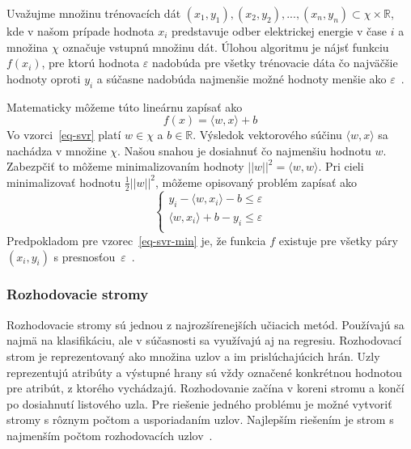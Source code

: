 \documentclass[a4paper,slovak,12pt,appendix]{article}
\begin{document}
Uvažujme množinu trénovacích dát
${(x_1, y_1), (x_2, y_2), ..., (x_n, y_n)} \subset \chi \times \mathbb{R}$, kde
v našom prípade hodnota $x_i$ predstavuje odber elektrickej energie v čase $i$
a množina $\chi$ označuje vstupnú množinu dát. Úlohou algoritmu je nájsť
funkciu  $f(x_i)$, pre ktorú hodnota $\varepsilon$ nadobúda pre všetky
trénovacie dáta čo najväčšie hodnoty oproti $y_i$ a súčasne nadobúda
najmenšie možné hodnoty menšie ako $\varepsilon$~\cite{Smola2004}.

Matematicky môžeme túto lineárnu zapísať ako
\begin{equation}
  f(x) = \langle w, x \rangle +  b
  \label{eq-svr}
\end{equation}
Vo vzorci~\ref{eq-svr} platí $w \in \chi$ a $b \in \mathbb{R}$. Výsledok
vektorového súčinu $\langle w, x \rangle$ sa nachádza v množine $\chi$. Našou
snahou je dosiahnuť čo najmenšiu hodnotu $w$. Zabezpčiť to môžeme
minimalizovaním hodnoty $|| w ||^2 = \langle w, w \rangle$. Pri cieli
minimalizovať hodnotu $\frac{1}{2} || w ||^2$, môžeme opisovaný problém zapísať
ako
\begin{equation}
  \begin{cases}
    y_i - \langle w, x_i \rangle - b \leq \varepsilon \\
    \langle w, x_i \rangle + b - y_i \leq \varepsilon \\
  \end{cases}
  \label{eq-svr-min}
\end{equation}
Predpokladom pre vzorec~\ref{eq-svr-min} je, že funkcia $f$ existuje pre všetky
páry $(x_i, y_i)$ s presnosťou~$\varepsilon$~\cite{Smola2004}.


\subsubsection{Rozhodovacie stromy}
Rozhodovacie stromy sú jednou z najrozšírenejších učiacich metód. Používajú sa
najmä na klasifikáciu, ale v súčasnosti sa využívajú aj na regresiu.
Rozhodovací strom je reprezentovaný ako množina uzlov a im prislúchajúcich
hrán. Uzly reprezentujú atribúty a výstupné hrany sú vždy označené konkrétnou
hodnotou pre atribút, z ktorého vychádzajú. Rozhodovanie začína v koreni stromu
a končí po dosiahnutí listového uzla. Pre riešenie jedného problému je možné
vytvoriť stromy s rôznym počtom a usporiadaním uzlov. Najlepším riešením je
strom s najmenším počtom rozhodovacích uzlov~\cite{Merz1998}.
\end{document}
